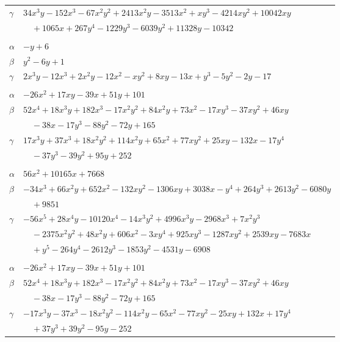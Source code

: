 \documentclass[11pt]{article}
\begin{document}
\begin{longtable}{@{}ll@{}}
$\gamma$ & $34x^{3}y-152x^{3}-67x^{2}y^{2}+2413x^{2}y-3513x^{2}+xy^{3}-4214xy^{2}+10042xy$\\
 & $\quad +1065x+267y^{4}-1229y^{3}-6039y^{2}+11328y-10342$\\
\addlinespace[3pt]
\multicolumn{2}{@{}l}{$\{i,j\}=\{5,8\}$, $k_{ij}=2^{2}\cdot 3^{2}$}\\
$\alpha$ & $-y+6$\\
$\beta$ & $y^{2}-6y+1$\\
$\gamma$ & $2x^{3}y-12x^{3}+2x^{2}y-12x^{2}-xy^{2}+8xy-13x+y^{3}-5y^{2}-2y-17$\\
\addlinespace[3pt]
\multicolumn{2}{@{}l}{$\{i,j\}=\{5,35\}$, $k_{ij}=2^{3}\cdot 3^{3}$}\\
$\alpha$ & $-26x^{2}+17xy-39x+51y+101$\\
$\beta$ & $52x^{4}+18x^{3}y+182x^{3}-17x^{2}y^{2}+84x^{2}y+73x^{2}-17xy^{3}-37xy^{2}+46xy$\\
 & $\quad -38x-17y^{3}-88y^{2}-72y+165$\\
$\gamma$ & $17x^{3}y+37x^{3}+18x^{2}y^{2}+114x^{2}y+65x^{2}+77xy^{2}+25xy-132x-17y^{4}$\\
 & $\quad -37y^{3}-39y^{2}+95y+252$\\
\addlinespace[3pt]
\multicolumn{2}{@{}l}{$\{i,j\}=\{5,48\}$, $k_{ij}=3^{3}\cdot 31^{2}$}\\
$\alpha$ & $56x^{2}+10165x+7668$\\
$\beta$ & $-34x^{3}+66x^{2}y+652x^{2}-132xy^{2}-1306xy+3038x-y^{4}+264y^{3}+2613y^{2}-6080y$\\
 & $\quad +9851$\\
$\gamma$ & $-56x^{5}+28x^{4}y-10120x^{4}-14x^{3}y^{2}+4996x^{3}y-2968x^{3}+7x^{2}y^{3}$\\
 & $\quad -2375x^{2}y^{2}+48x^{2}y+606x^{2}-3xy^{4}+925xy^{3}-1287xy^{2}+2539xy-7683x$\\
 & $\quad +y^{5}-264y^{4}-2612y^{3}-1853y^{2}-4531y-6908$\\
\addlinespace[3pt]
\multicolumn{2}{@{}l}{$\{i,j\}=\{5,60\}$, $k_{ij}=2^{3}\cdot 3^{3}$}\\
$\alpha$ & $-26x^{2}+17xy-39x+51y+101$\\
$\beta$ & $52x^{4}+18x^{3}y+182x^{3}-17x^{2}y^{2}+84x^{2}y+73x^{2}-17xy^{3}-37xy^{2}+46xy$\\
 & $\quad -38x-17y^{3}-88y^{2}-72y+165$\\
$\gamma$ & $-17x^{3}y-37x^{3}-18x^{2}y^{2}-114x^{2}y-65x^{2}-77xy^{2}-25xy+132x+17y^{4}$\\
 & $\quad +37y^{3}+39y^{2}-95y-252$\\

\end{longtable}
\end{document}
